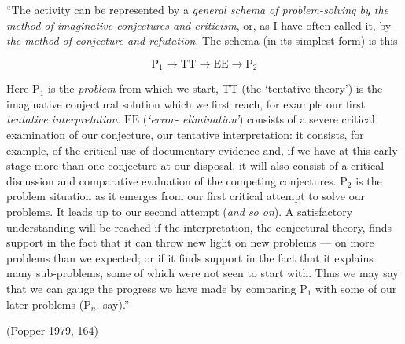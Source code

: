 \documentclass[
  12pt,
  a4paper,
  oneside]{tesesusp}
\begin{document}
\vspace{10pt}

``The activity can be represented by a \emph{general schema of
problem-solving by the method of imaginative conjectures and criticism},
or, as I have often called it, by \emph{the method of conjecture and
refutation}. The schema (in its simplest form) is this

\[
\text{P}_{1} \to \text{TT} \to \text{EE} \to \text{P}_{2} 
\]

\vspace{15pt}

Here \(\text{P}_{1}\) is the \emph{problem} from which we start,
\(\text{TT}\) (the `tentative theory') is the imaginative conjectural
solution which we first reach, for example our first \emph{tentative
interpretation}. \(\text{EE}\) (\emph{`error- elimination'}) consists of
a severe critical examination of our conjecture, our tentative
interpretation: it consists, for example, of the critical use of
documentary evidence and, if we have at this early stage more than one
conjecture at our disposal, it will also consist of a critical
discussion and comparative evaluation of the competing conjectures.
\(\text{P}_{2}\) is the problem situation as it emerges from our first
critical attempt to solve our problems. It leads up to our second
attempt (\emph{and so on}). A satisfactory understanding will be reached
if the interpretation, the conjectural theory, finds support in the fact
that it can throw new light on new problems --- on more problems than we
expected; or if it finds support in the fact that it explains many
sub-problems, some of which were not seen to start with. Thus we may say
that we can gauge the progress we have made by comparing
\(\text{P}_{1}\) with some of our later problems (\(\text{P}_{n}\),
say).''

\vspace{15pt}

\noindent \hspace*{\fill} (Popper 1979, 164)
\end{document}
